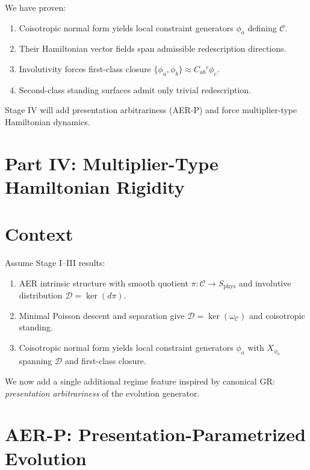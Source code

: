 \documentclass[11pt]{article}
\theoremstyle{remark}
\theoremstyle{plain}
\begin{document}
We have proven:
\begin{enumerate}
\item Coisotropic normal form yields local constraint generators $\phi_a$ defining $\mathcal{C}$.
\item Their Hamiltonian vector fields span admissible redescription directions.
\item Involutivity forces first-class closure $\{\phi_a,\phi_b\}\approx C_{ab}{}^{c}\phi_c$.
\item Second-class standing surfaces admit only trivial redescription.
\end{enumerate}

Stage IV will add presentation arbitrariness (AER-P) and force multiplier-type Hamiltonian dynamics.



\section*{Part IV: Multiplier-Type Hamiltonian Rigidity}




\section{Context}

Assume Stage I--III results:
\begin{enumerate}
\item AER intrinsic structure with smooth quotient $\pi:\mathcal{C}\to S_{\mathrm{phys}}$ and involutive distribution $\mathcal{D}=\ker(d\pi)$.
\item Minimal Poisson descent and separation give $\mathcal{D}=\ker(\omega_{\mathcal{C}})$ and coisotropic standing.
\item Coisotropic normal form yields local constraint generators $\phi_a$ with $X_{\phi_a}$ spanning $\mathcal{D}$ and first-class closure.
\end{enumerate}

We now add a single additional regime feature inspired by canonical GR:
\emph{presentation arbitrariness} of the evolution generator.

\section{AER-P: Presentation-Parametrized Evolution}
\end{document}
